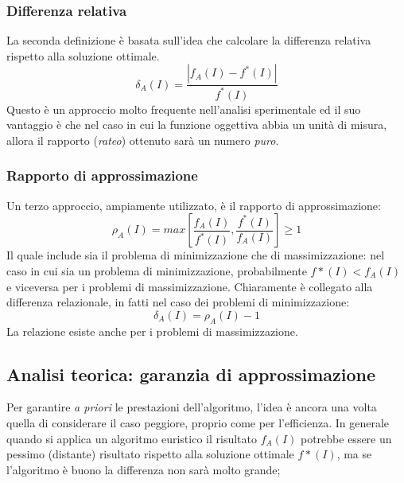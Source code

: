 \documentclass{article}
\begin{document}
\subsubsection{Differenza relativa}
La seconda definizione è basata sull'idea che calcolare la differenza relativa rispetto alla soluzione
ottimale.
$$\delta_A(I)=\frac{|f_A(I)-f^*(I)|}{f^*(I)}$$
Questo è un approccio molto frequente nell'analisi sperimentale ed il suo vantaggio è che nel caso in
cui la funzione oggettiva abbia un unità di misura, allora il rapporto (\textit{rateo}) ottenuto sarà
un numero \textit{puro}.

\subsubsection{Rapporto di approssimazione}
Un terzo approccio, ampiamente utilizzato, è il rapporto di approssimazione:
$$\rho_A(I)=max\left[\frac{f_A(I)}{f^*(I)},\frac{f^*(I)}{f_A(I)}\right]\geq 1$$
Il quale include sia il problema di minimizzazione che di massimizzazione: nel caso in cui sia un
problema di minimizzazione, probabilmente $f*(I)<f_A(I)$ e viceversa per i problemi di massimizzazione.
Chiaramente è collegato alla differenza relazionale, in fatti nel caso dei problemi di minimizzazione:
$$\delta_A(I)=\rho_A(I)-1$$
La relazione esiste anche per i problemi di massimizzazione.

\subsection{Analisi teorica: garanzia di approssimazione}
Per garantire \textit{a priori} le prestazioni dell'algoritmo, l'idea è ancora una volta quella
di considerare il caso peggiore, proprio come per l'efficienza. In generale quando si applica
un algoritmo euristico il risultato $f_A(I)$ potrebbe essere un pessimo (distante) risultato
rispetto alla soluzione ottimale $f*(I)$, ma se l'algoritmo è buono la differenza non sarà
molto grande;
\end{document}
